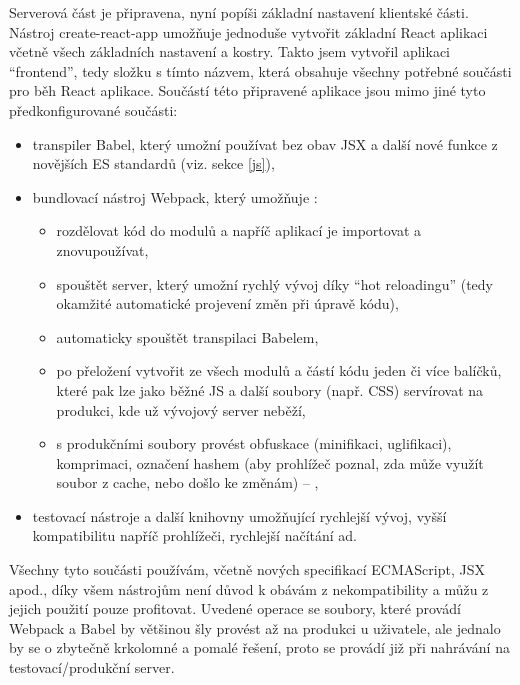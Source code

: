     Serverová část je připravena, nyní popíši základní nastavení klientské části. Nástroj create-react-app umožňuje jednoduše vytvořit základní React aplikaci včetně všech základních nastavení a kostry. Takto jsem vytvořil aplikaci \enquote{frontend}, tedy složku s tímto názvem, která obsahuje všechny potřebné součásti pro běh React aplikace. Součástí této připravené aplikace jsou mimo jiné tyto předkonfigurované součásti:
    \begin{itemize}
        \item transpiler Babel, který umožní používat bez obav JSX a další nové funkce z novějších ES standardů (viz. sekce \ref{js}),
        \item bundlovací nástroj Webpack, který umožňuje \cite{webpack-ackee}:
            \begin{itemize}
                \item rozdělovat kód do modulů a napříč aplikací je importovat a znovupoužívat,
                \item spouštět server, který umožní rychlý vývoj díky \enquote{hot reloadingu} (tedy okamžité automatické projevení změn při úpravě kódu),
                \item automaticky spouštět transpilaci Babelem,
                \item po přeložení vytvořit ze všech modulů a částí kódu jeden či více balíčků, které pak lze jako běžné JS a další soubory (např. CSS) servírovat na produkci, kde už vývojový server neběží,
                \item s produkčními soubory provést obfuskace (minifikaci, uglifikaci), komprimaci, označení hashem (aby prohlížeč poznal, zda může využít soubor z cache, nebo došlo ke změnám) -- ,
            \end{itemize}
        \item testovací nástroje a další knihovny umožňující rychlejší vývoj, vyšší kompatibilitu napříč prohlížeči, rychlejší načítání ad.
    \end{itemize}
    Všechny tyto součásti používám, včetně nových specifikací ECMAScript, JSX apod., díky všem nástrojům není důvod k obávám z nekompatibility a můžu z jejich použití pouze profitovat. Uvedené operace se soubory, které provádí Webpack a Babel by většinou šly provést až na produkci u uživatele, ale jednalo by se o zbytečně krkolomné a pomalé řešení, proto se provádí již při nahrávání na testovací/produkční server.
    
